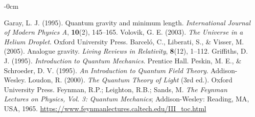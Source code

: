 \documentclass[entropy,article,submit,pdftex,oneauthor]{Definitions/mdpi}
\begin{document}
\begin{adjustwidth}{-\extralength}{0cm}
{\begin{thebibliography}{999}
Garay, L. J. (1995). Quantum gravity and minimum length. \textit{International Journal of Modern Physics A}, \textbf{10}(2), 145–165.
Volovik, G. E. (2003). \textit{The Universe in a Helium Droplet}. Oxford University Press.
Barceló, C., Liberati, S., \& Visser, M. (2005). Analogue gravity. \textit{Living Reviews in Relativity}, \textbf{8}(12), 1–112.
Griffiths, D. J. (1995). \textit{Introduction to Quantum Mechanics}. Prentice Hall.
Peskin, M. E., \& Schroeder, D. V. (1995). \textit{An Introduction to Quantum Field Theory}. Addison-Wesley.
Loudon, R. (2000). \textit{The Quantum Theory of Light} (3rd ed.). Oxford University Press.
Feynman, R.P.; Leighton, R.B.; Sands, M. \textit{The Feynman Lectures on Physics, Vol. 3: Quantum Mechanics}; Addison-Wesley: Reading, MA, USA, 1965. \url{https://www.feynmanlectures.caltech.edu/III_toc.html}
\end{thebibliography}
}




%


\end{adjustwidth}
\end{document}
